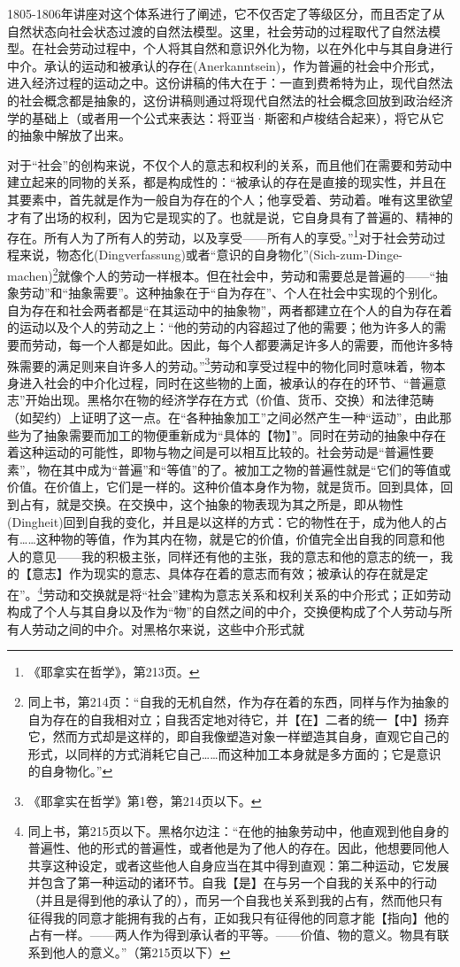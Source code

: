 1805-1806年讲座对这个体系进行了阐述，它不仅否定了等级区分，而且否定了从自然状态向社会状态过渡的自然法模型。这里，社会劳动的过程取代了自然法模型。在社会劳动过程中，个人将其自然和意识外化为物，以在外化中与其自身进行中介。承认的运动和被承认的存在(Anerkanntsein)，作为普遍的社会中介形式，进入经济过程的运动之中。这份讲稿的伟大在于：一直到费希特为止，现代自然法的社会概念都是抽象的，这份讲稿则通过将现代自然法的社会概念回放到政治经济学的基础上（或者用一个公式来表达：将亚当·斯密和卢梭结合起来），将它从它的抽象中解放了出来。

对于“社会”的创构来说，不仅个人的意志和权利的关系，而且他们在需要和劳动中建立起来的同物的关系，都是构成性的：“被承认的存在是直接的现实性，并且在其要素中，首先就是作为一般自为存在的个人；他享受着、劳动着。唯有这里欲望才有了出场的权利，因为它是现实的了。也就是说，它自身具有了普遍的、精神的存在。所有人为了所有人的劳动，以及享受——所有人的享受。”\footnote{《耶拿实在哲学》，第213页。}对于社会劳动过程来说，物态化(Dingverfassung)或者“意识的自身物化”(Sich-zum-Dinge-machen)\footnote{同上书，第214页：“自我的无机自然，作为存在着的东西，同样与作为抽象的自为存在的自我相对立；自我否定地对待它，并【在】二者的统一【中】扬弃它，然而方式却是这样的，即自我像塑造对象一样塑造其自身，直观它自己的形式，以同样的方式消耗它自己……而这种加工本身就是多方面的；它是意识的自身物化。”}就像个人的劳动一样根本。但在社会中，劳动和需要总是普遍的——“抽象劳动”和“抽象需要”。这种抽象在于“自为存在”、个人在社会中实现的个别化。自为存在和社会两者都是“在其运动中的抽象物”，两者都建立在个人的自为存在着的运动以及个人的劳动之上：“他的劳动的内容超过了他的需要；他为许多人的需要而劳动，每一个人都是如此。因此，每个人都要满足许多人的需要，而他许多特殊需要的满足则来自许多人的劳动。”\footnote{《耶拿实在哲学》第1卷，第214页以下。}劳动和享受过程中的物化同时意味着，物本身进入社会的中介化过程，同时在这些物的上面，被承认的存在的环节、“普遍意志”开始出现。黑格尔在物的经济学存在方式（价值、货币、交换）和法律范畴（如契约）上证明了这一点。在“各种抽象加工”之间必然产生一种“运动”，由此那些为了抽象需要而加工的物便重新成为“具体的【物】”。同时在劳动的抽象中存在着这种运动的可能性，即物与物之间是可以相互比较的。社会劳动是“普遍性要素”，物在其中成为“普遍”和“等值”的了。被加工之物的普遍性就是“它们的等值或价值。在价值上，它们是一样的。这种价值本身作为物，就是货币。回到具体，回到占有，就是交换。在交换中，这个抽象的物表现为其之所是，即从物性(Dingheit)回到自我的变化，并且是以这样的方式：它的物性在于，成为他人的占有……这种物的等值，作为其内在物，就是它的价值，价值完全出自我的同意和他人的意见——我的积极主张，同样还有他的主张，我的意志和他的意志的统一，我的【意志】作为现实的意志、具体存在着的意志而有效；被承认的存在就是定在”。\footnote{同上书，第215页以下。黑格尔边注：“在他的抽象劳动中，他直观到他自身的普遍性、他的形式的普遍性，或者他是为了他人的存在。因此，他想要同他人共享这种设定，或者这些他人自身应当在其中得到直观：第二种运动，它发展并包含了第一种运动的诸环节。自我【是】在与另一个自我的关系中的行动（并且是得到他的承认了的），而另一个自我也关系到我的占有，然而他只有征得我的同意才能拥有我的占有，正如我只有征得他的同意才能【指向】他的占有一样。——两人作为得到承认者的平等。——价值、物的意义。物具有联系到他人的意义。”（第215页以下）}劳动和交换就是将“社会”建构为意志关系和权利关系的中介形式；正如劳动构成了个人与其自身以及作为“物”的自然之间的中介，交换便构成了个人劳动与所有人劳动之间的中介。对黑格尔来说，这些中介形式就